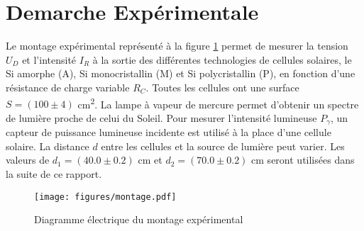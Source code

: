 \section{Demarche Expérimentale}

Le montage expérimental représenté à la figure \ref{fig:montage} permet de mesurer la tension \(U_D\) et l'intensité \(I_R\) à la sortie des différentes technologies de cellules solaires, le Si amorphe (A), Si monocristallin (M) et Si polycristallin (P), en fonction d'une résistance de charge variable \(R_C\).
Toutes les cellules ont une surface \(S = (100 \pm 4)\) \unit{\centi\meter^2}. La lampe à vapeur de mercure permet d'obtenir un spectre de lumière proche de celui du Soleil.
Pour mesurer l'intensité lumineuse \(P_\gamma\), un capteur de puissance lumineuse incidente est utilisé à la place d'une cellule solaire.
La distance \(d\) entre les cellules et la source de lumière peut varier. Les valeurs de \(d_1 = (40.0 \pm 0.2)\) \unit{\centi\meter} et \(d_2 = (70.0 \pm 0.2)\) \unit{\centi\meter} seront utilisées dans la suite de ce rapport.


\begin{figure}
    \centering
    \texttt{[image: figures/montage.pdf]}
    \caption{Diagramme électrique du montage expérimental \cite{notice} \cite{nicole}}
    \label{fig:montage}
\end{figure}

